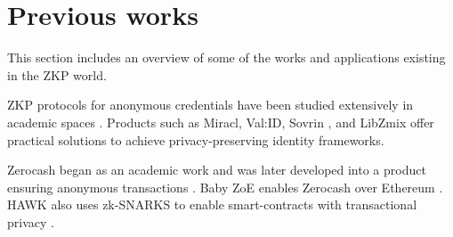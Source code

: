 \section{Previous works}
\label{apps:previous-works}

This section includes an overview of some of the works and applications existing in the ZKP world. 


ZKP protocols for anonymous credentials have been studied extensively in academic spaces \cite{2010:SCN:Solving-Revocation-with-Efficient-Update-of-Anonymous-Credentials,
2014:architecture-for-ABC-technologies,
2017:ccs:Practical-UC-Secure-Delegatable-Credentials-with-attributes,
2017:SP:Accumulators-with-Applications-to-Anonymity-Preserving-Revocation,
2018:NSDI:zkLedger}.  
Products such as Miracl, Val:ID, Sovrin \cite{2018:sovrin}, and LibZmix \cite{2019:github:libzmix} offer practical solutions to achieve privacy-preserving identity frameworks.  

Zerocash began as an academic work and was later developed into a product ensuring anonymous transactions \cite{2014:BCGGMTV:SP:Zerocash}. 
Baby ZoE enables Zerocash over Ethereum \cite{2018:github:baby-zoe}.
HAWK also uses zk-SNARKS to enable smart-contracts with transactional privacy \cite{2016:SP:Hawk}.

